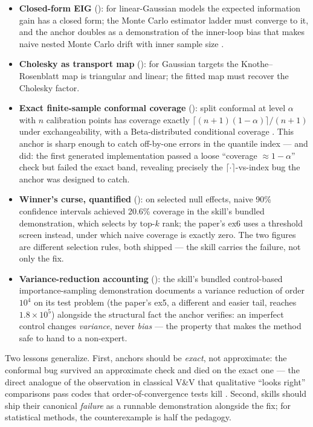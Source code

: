 \documentclass[11pt,a4paper]{article}
\begin{document}
\begin{itemize}[leftmargin=1.6em]
\item \textbf{Closed-form EIG} (): for
linear-Gaussian models the expected information gain has a closed form; the
Monte Carlo estimator ladder must converge to it, and the anchor doubles as
a demonstration of the inner-loop bias that makes naive nested Monte Carlo
drift with inner sample size \citep{ryan2016}.
\item \textbf{Cholesky as transport map}
(): for Gaussian targets the
Knothe--Rosenblatt map is triangular and linear; the fitted map must
recover the Cholesky factor.
\item \textbf{Exact finite-sample conformal coverage}
(): split conformal at level $\alpha$ with $n$
calibration points has coverage exactly
$\lceil (n{+}1)(1{-}\alpha)\rceil/(n{+}1)$ under exchangeability, with a
Beta-distributed conditional coverage \citep{vovk2005}. This anchor is
sharp enough to catch off-by-one errors in the quantile index --- and did:
the first generated implementation passed a loose ``coverage
$\approx 1-\alpha$'' check but failed the exact band, revealing precisely
the \mbox{$\lceil\cdot\rceil$-vs-index} bug the anchor was designed to
catch.
\item \textbf{Winner's curse, quantified} ():
on selected null effects, naive 90\% confidence intervals achieved 20.6\%
coverage in the skill's bundled demonstration, which selects by top-$k$
rank; the paper's ex6 uses a threshold screen instead, under which naive
coverage is exactly zero. The two figures are different selection rules,
both shipped --- the skill carries the failure, not only the fix.
\item \textbf{Variance-reduction accounting} ():
the skill's bundled control-based importance-sampling demonstration
documents a variance reduction of order $10^4$ on its test problem (the
paper's ex5, a different and easier tail, reaches $1.8\times10^{5}$)
alongside the structural fact the anchor verifies: an imperfect control
changes \emph{variance}, never \emph{bias} --- the property that makes the
method safe to hand to a non-expert.
\end{itemize}

Two lessons generalize. First, anchors should be \emph{exact}, not
approximate: the conformal bug survived an approximate check and died on
the exact one --- the direct analogue of the observation in classical V\&V
that qualitative ``looks right'' comparisons pass codes that
order-of-convergence tests kill \citep{roache1998}. Second, skills should
ship their canonical \emph{failure} as a runnable demonstration alongside
the fix; for statistical methods, the counterexample is half the pedagogy.
\end{document}
